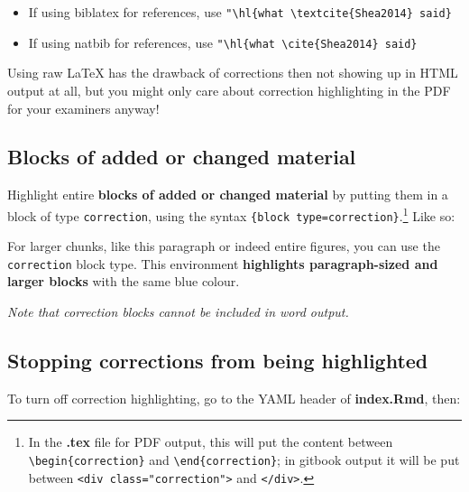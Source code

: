 \documentclass[a4paper, nobind]{templates/ociamthesis}
\providecommand{\tightlist}{%
  \setlength{\itemsep}{0pt}\setlength{\parskip}{0pt}}
\begin{document}
\begin{itemize}
\tightlist
\item
  If using biblatex for references, use \texttt{"\textbackslash{}hl\{what\ \textbackslash{}textcite\{Shea2014\}\ said\}}
\item
  If using natbib for references, use \texttt{"\textbackslash{}hl\{what\ \textbackslash{}cite\{Shea2014\}\ said\}}
\end{itemize}

Using raw LaTeX has the drawback of corrections then not showing up in HTML output at all, but you might only care about correction highlighting in the PDF for your examiners anyway!

\hypertarget{blocks-of-added-or-changed-material}{%
\subsection{Blocks of added or changed material}\label{blocks-of-added-or-changed-material}}

Highlight entire \textbf{blocks of added or changed material} by putting them in a block of type \texttt{correction}, using the syntax \texttt{\textasciigrave{}\textasciigrave{}\textasciigrave{}\{block\ type=\textquotesingle{}correction\textquotesingle{}\}}.\footnote{In the \textbf{.tex} file for PDF output, this will put the content between \texttt{\textbackslash{}begin\{correction\}} and \texttt{\textbackslash{}end\{correction\}}; in gitbook output it will be put between \texttt{\textless{}div\ class="correction"\textgreater{}} and \texttt{\textless{}/div\textgreater{}}.}
Like so:

\begin{correction}
For larger chunks, like this paragraph or indeed entire figures, you can
use the \texttt{correction} block type. This environment
\textbf{highlights paragraph-sized and larger blocks} with the same blue
colour.
\end{correction}

\emph{Note that correction blocks cannot be included in word output.}

\hypertarget{stopping-corrections-from-being-highlighted}{%
\subsection{Stopping corrections from being highlighted}\label{stopping-corrections-from-being-highlighted}}

To turn off correction highlighting, go to the YAML header of \textbf{index.Rmd}, then:
\end{document}
